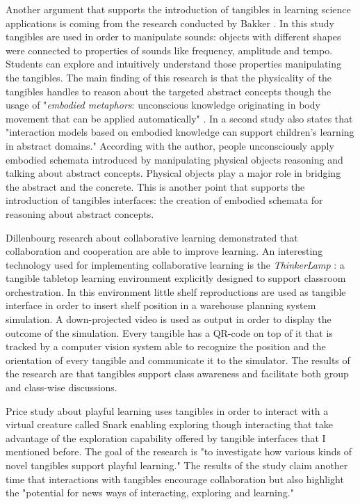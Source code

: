 Another argument that supports the introduction of tangibles in learning science applications is coming from the research conducted by Bakker \cite{bakker:moso}. In this study tangibles are used in order to manipulate sounds: objects with different shapes were connected to properties of sounds like frequency, amplitude and tempo. Students can explore and intuitively understand those properties manipulating the tangibles. The main finding of this research is that the physicality of the tangibles handles to reason about the targeted abstract concepts though the usage of "\textit{embodied metaphors}: unconscious knowledge originating in body movement that can be applied automatically" \cite{bakker:moso}. In a second study \cite{bakker:embodied} also states that "interaction models based on embodied knowledge can support children’s learning in abstract domains." \cite{bakker:embodied} According with the author, people unconsciously apply embodied schemata introduced by manipulating physical objects reasoning and talking about abstract concepts. Physical objects play a major role in bridging the abstract and the concrete. This is another point that supports the introduction of tangibles interfaces: the creation of embodied schemata for reasoning about abstract concepts. 

Dillenbourg research \cite{dillenbourg:you} about collaborative learning demonstrated that collaboration and cooperation are able to improve learning. An interesting technology used for implementing collaborative learning is the \textit{ThinkerLamp} \cite{do:tinkerlamp}: a tangible tabletop learning environment explicitly designed to support classroom orchestration. In this environment little shelf reproductions are used as tangible interface in order to insert shelf position in a warehouse planning system simulation. A down-projected video is used as output in order to display the outcome of the simulation. Every tangible has a QR-code on top of it that is tracked by a computer vision system able to recognize the position and the orientation of every tangible and communicate it to the simulator. The results of the research are that tangibles support class awareness and facilitate both group and class-wise discussions.

Price study \cite{price:snark} about playful learning uses tangibles in order to interact with a virtual creature called Snark enabling exploring though interacting that take advantage of the exploration capability offered by tangible interfaces that I mentioned before. The goal of the research is "to investigate how various kinds of novel tangibles support playful learning." \cite{price:snark} The results of the study claim another time that interactions with tangibles encourage collaboration but also highlight the "potential for news ways of interacting, exploring and learning." \cite{price:snark}

